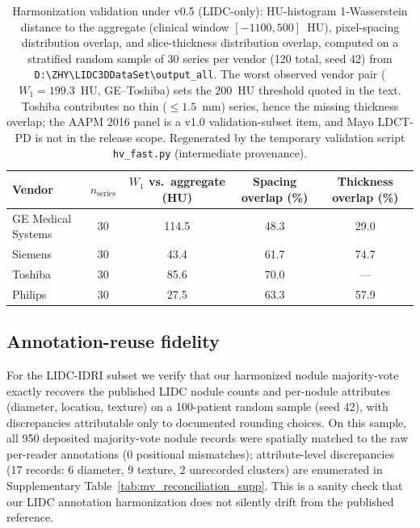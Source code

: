 \documentclass[twoside,11pt]{article}
\begin{document}
\begin{table}[ht]
    \centering
    \small
    \setlength{\tabcolsep}{4pt}
    \begin{tabular}{lcccc}
        \toprule
        Vendor & $n_{\text{series}}$ & $W_1$ vs.\ aggregate (HU) & Spacing overlap (\%) & Thickness overlap (\%) \\
        \midrule
        GE Medical Systems & 30 & 114.5 & 48.3 & 29.0 \\
        Siemens          & 30 & 43.4  & 61.7 & 74.7 \\
        Toshiba          & 30 & 85.6  & 70.0 & --- \\
        Philips          & 30 & 27.5  & 63.3 & 57.9 \\
        \bottomrule
    \end{tabular}
    \caption{Harmonization validation under v0.5 (LIDC-only): HU-histogram 1-Wasserstein distance to the aggregate (clinical window $[-1100, 500]$~HU), pixel-spacing distribution overlap, and slice-thickness distribution overlap, computed on a stratified random sample of 30 series per vendor (120 total, seed 42) from \texttt{D:\textbackslash ZHY\textbackslash LIDC3DDataSet\textbackslash output\_all}. The worst observed vendor pair ($W_1 = 199.3$~HU, GE--Toshiba) sets the 200~HU threshold quoted in the text. Toshiba contributes no thin ($\leq 1.5$~mm) series, hence the missing thickness overlap; the AAPM 2016 panel is a v1.0 validation-subset item, and Mayo LDCT-PD is not in the release scope. Regenerated by the temporary validation script \texttt{hv\_fast.py} (intermediate provenance).}
    \label{tab:harmonization_v05}
\end{table}

\subsection*{Annotation-reuse fidelity}
For the LIDC-IDRI subset we verify that our harmonized nodule majority-vote exactly recovers the published LIDC nodule counts and per-nodule attributes (diameter, location, texture) on a 100-patient random sample (seed 42), with discrepancies attributable only to documented rounding choices. On this sample, all 950 deposited majority-vote nodule records were spatially matched to the raw per-reader annotations (0 positional mismatches); attribute-level discrepancies (17 records: 6 diameter, 9 texture, 2 unrecorded clusters) are enumerated in Supplementary Table~\ref{tab:mv_reconciliation_supp}. This is a sanity check that our LIDC annotation harmonization does not silently drift from the published reference.
\end{document}
